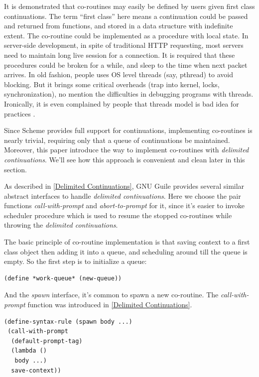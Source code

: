 \documentclass[numbers,numberedpars]{sigplanconf}
\begin{document}
It is demonstrated that co-routines may easily be defined by users given first class continuations\citep{Haynes:1984:CC:800055.802046}. The
term ``first class'' here means a continuation could be passed and returned from functions, and stored in a data structure with indefinite
extent. The co-routine could be implemented as a procedure with local state. In server-side development, in spite of traditional HTTP requesting,
most servers need to maintain long live session for a connection. It is required that these procedures could be broken for a while, and sleep
to the time when next packet arrives. In old fashion, people uses OS level threads (say, pthread) to avoid blocking. But it brings some
critical overheads (trap into kernel, locks, synchronization), no mention the difficulties in debugging programs with threads. Ironically,
it is even complained by people that threads model is bad idea for practices \citep{ousterhout1996threads}.

Since Scheme provides full support for continuations, implementing co-routines is nearly trivial, requiring only that a queue of continuations
be maintained. Moreover, this paper introduce the way to implement co-routines with {\it delimited continuations}. We'll see how this approach is
convenient and clean later in this section.

As described in \ref{Delimited Continuations}, GNU Guile provides several similar abstract interfaces to handle {\it delimited continuations}.
Here we choose the pair functions {\it call-with-prompt} and {\it abort-to-prompt} for it, since it's easier to invoke scheduler procedure
which is used to resume the stopped co-routines while throwing the {\it delimited continuations}.

The basic principle of co-routine implementation is that saving context to a first class object then adding it into a queue, and scheduling
around till the queue is empty. So the first step is to initialize a queue:

\begin{lstlisting}
(define *work-queue* (new-queue))
\end{lstlisting}

And the {\it spawn} interface, it's common to spawn a new co-routine. The {\it call-with-prompt} function was introduced in
\ref{Delimited Continuations}.

\begin{lstlisting}
(define-syntax-rule (spawn body ...)
 (call-with-prompt
  (default-prompt-tag)
  (lambda ()
   body ...)
  save-context))
\end{lstlisting}
\end{document}
